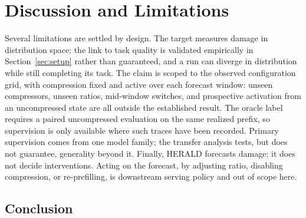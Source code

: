 \section{Discussion and Limitations}

\label{sec:discussion}


Several limitations are settled by design. The target measures damage in
distribution space; the link to task quality is validated empirically in
Section~\ref{sec:setup} rather than guaranteed, and a run can diverge in
distribution while still completing its task. The claim is scoped to the
observed configuration grid, with compression fixed and active over each
forecast window: unseen compressors, unseen ratios, mid-window switches, and
prospective activation from an uncompressed state are all outside the
established result. The oracle label requires a paired uncompressed
evaluation on the same realized prefix, so supervision is only available
where such traces have been recorded. Primary supervision comes from one
model family; the transfer analysis tests, but does not guarantee, generality
beyond it. Finally, HERALD forecasts damage; it does not decide
interventions. Acting on the forecast, by adjusting ratio, disabling
compression, or re-prefilling, is downstream serving policy and out of scope
here.

\subsection*{Conclusion}
